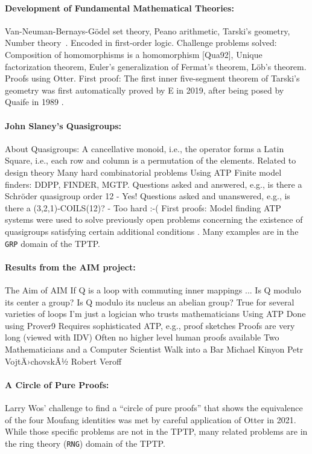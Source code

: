 \documentclass[runningheads]{llncs}
\begin{document}
\paragraph{Development of Fundamental Mathematical Theories:}
Van-Neuman-Bernays-Gödel set theory\cite{Qua92-JAR},
Peano arithmetic,
Tarski's geometry,
Number theory~\cite{Qua92-Book}.
Encoded in first-order logic.
Challenge problems solved:
Composition of homomorphisms is a homomorphism [Qua92],
Unique factorization theorem,
Euler's generalization of Fermat's theorem,
Löb's theorem.
Proofs using Otter.
First proof: 
The first inner five-segment theorem of Tarski's geometry \cite{SST83} was first
automatically proved by E \cite{Sch13-LPAR} in 2019, after being posed by Quaife in
1989 \cite{Qua89}.

\paragraph{John Slaney's Quasigroups:}
About Quasigroups: A cancellative monoid, i.e., the operator forms a Latin Square, 
i.e., each row and column is a permutation of the elements.
Related to design theory
Many hard combinatorial problems
Using ATP
Finite model finders: DDPP, FINDER, MGTP.
Questions asked and answered, e.g.,
is there a Schröder quasigroup order 12 - Yes!
Questions asked and unanswered, e.g.,
is there a (3,2,1)-COILS(12)? - Too hard :-(
First proofs: Model finding ATP systems were used to solve previously open problems concerning the
existence of quasigroups satisfying certain additional conditions \cite{SFS95}.
Many examples are in the {\tt GRP} domain of the TPTP.

\paragraph{Results from the AIM project:}
The Aim of AIM
If Q is a loop with commuting inner mappings ...
Is Q modulo its center a group?
Is Q modulo its nucleus an abelian group?
True for several varieties of loops
I'm just a logician who trusts mathematicians
Using ATP
Done using Prover9
Requires sophisticated ATP, e.g., proof sketches
Proofs are very long (viewed with IDV)
Often no higher level human proofs available
Two Mathematicians and a Computer Scientist Walk into a Bar
Michael Kinyon
Petr VojtÄ›chovskÃ½
Robert Veroff

\paragraph{A Circle of Pure Proofs:}
Larry Wos' challenge to find a ``circle of pure proofs'' that shows the equivalence
of the four Moufang identities \cite{Wos19} was met by careful application \cite{Ver22} of
Otter \cite{McC03-Otter} in 2021.
While those specific problems are not in the TPTP, many related problems are in the
ring theory ({\tt RNG}) domain of the TPTP.
\end{document}
